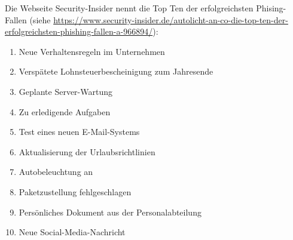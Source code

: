 \begin{frame}
Die Webseite Security-Insider nennt die Top Ten der erfolgreichsten Phising-Fallen (siehe \href{https://www.security-insider.de/autolicht-an-co-die-top-ten-der-erfolgreichsten-phishing-fallen-a-966894/}{https://www.security-insider.de/autolicht-an-co-die-top-ten-der-erfolgreichsten-phishing-fallen-a-966894/}):
\begin{enumerate}
  \item Neue Verhaltensregeln im Unternehmen
  \item Verspätete Lohnsteuerbescheinigung zum Jahresende
  \item Geplante Server-Wartung
  \item Zu erledigende Aufgaben
  \item Test eines neuen E-Mail-Systems
  \item Aktualisierung der Urlaubsrichtlinien
  \item Autobeleuchtung an
  \item Paketzustellung fehlgeschlagen
  \item Persönliches Dokument aus der Personalabteilung
  \item Neue Social-Media-Nachricht
\end{enumerate}
\end{frame}